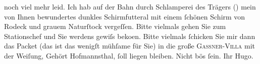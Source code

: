 \begin{ledgroupsized}[t]{13cm}
               noch viel mehr leid. Ich hab auf der Bahn durch Schlamperei des Trägers () mein von Ihnen bewundertes dunkles Schirmfutteral mit einem {\pb}ſchönen Schirm von Rodeck und grauem Naturſtock vergeſſen. Bitte
               vielmals gehen Sie zum Stationschef und Sie werdens gewiſs beko{\geminationm}en.
               Bitte vielmals ſchicken Sie mir dann das Packet (das ist das wenigſt mühſame für Sie)
                  {\pb}in die große \textsc{Gassner-Villa} mit der Weiſung, Gehört Hofmannsthal, ſoll liegen bleiben.\pend
           \pstart Nicht bös ſein. Ihr \spacefill\mbox{Hugo.}\pend{}\endnumbering{}\end{ledgroupsized}  \newcommand{\dateiname}{L00969}\newcommand{\titel}{Hugo von Hofmannsthal an Arthur Schnitzler, [8. 9. 1899]}\newcommand{\editorInnen}{Martin Anton Müller und Gerd-Hermann Susen}
      